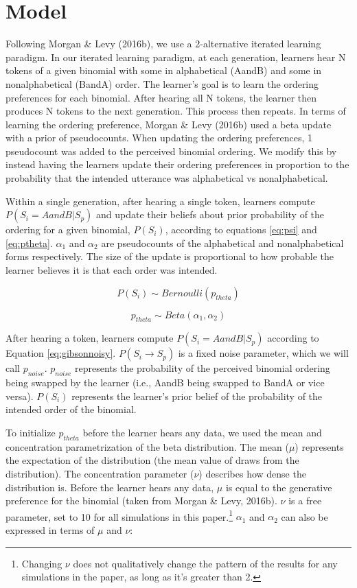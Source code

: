 \documentclass[10pt, letterpaper]{article}
\begin{document}
\hypertarget{model}{%
\section{Model}\label{model}}

Following Morgan \& Levy (2016b), we use a 2-alternative iterated
learning paradigm. In our iterated learning paradigm, at each
generation, learners hear N tokens of a given binomial with some in
alphabetical (AandB) and some in nonalphabetical (BandA) order. The
learner's goal is to learn the ordering preferences for each binomial.
After hearing all N tokens, the learner then produces N tokens to the
next generation. This process then repeats. In terms of learning the
ordering preference, Morgan \& Levy (2016b) used a beta update with a
prior of pseudocounts. When updating the ordering preferences, 1
pseudocount was added to the perceived binomial ordering. We modify this
by instead having the learners update their ordering preferences in
proportion to the probability that the intended utterance was
alphabetical vs nonalphabetical.

Within a single generation, after hearing a single token, learners
compute \(P(S_i = AandB|S_p)\) and update their beliefs about prior
probability of the ordering for a given binomial, \(P(S_i)\), according
to equations \ref{eq:psi} and \ref{eq:ptheta}. \(\alpha_1\) and
\(\alpha_2\) are pseudocounts of the alphabetical and nonalphabetical
forms respectively. The size of the update is proportional to how
probable the learner believes it is that each order was intended.

\begin{equation}
\label{eq:psi}
P(S_i) \sim Bernoulli(p_{theta})
\end{equation}

\begin{equation}
\label{eq:ptheta}
p_{theta} \sim Beta(\alpha_1, \alpha_2)
\end{equation}

After hearing a token, learners compute \(P(S_i = AandB|S_p)\) according
to Equation \ref{eq:gibsonnoisy}. \(P(S_i \to S_p)\) is a fixed noise
parameter, which we will call \(p_{noise}\). \(p_{noise}\) represents
the probability of the perceived binomial ordering being swapped by the
learner (i.e., AandB being swapped to BandA or vice versa). \(P(S_i)\)
represents the learner's prior belief of the probability of the intended
order of the binomial.

To initialize \(p_{theta}\) before the learner hears any data, we used
the mean and concentration parametrization of the beta distribution. The
mean (\(\mu\)) represents the expectation of the distribution (the mean
value of draws from the distribution). The concentration parameter
(\(\nu\)) describes how dense the distribution is. Before the learner
hears any data, \(\mu\) is equal to the generative preference for the
binomial (taken from Morgan \& Levy, 2016b). \(\nu\) is a free
parameter, set to 10 for all simulations in this paper.\footnote{Changing
  \(\nu\) does not qualitatively change the pattern of the results for
  any simulations in the paper, as long as it's greater than 2.}
\(\alpha_1\) and \(\alpha_2\) can also be expressed in terms of \(\mu\)
and \(\nu\):
\end{document}
